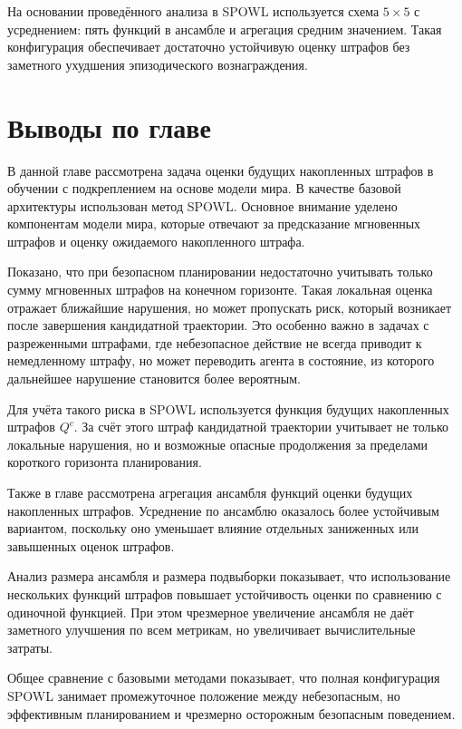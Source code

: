 На основании проведённого анализа в SPOWL используется схема $5 \times 5$ с усреднением: пять функций в ансамбле и агрегация средним значением. Такая конфигурация обеспечивает достаточно устойчивую оценку штрафов без заметного ухудшения эпизодического вознаграждения.
\FloatBarrier

\section{Выводы по главе}
\label{sec:chapter2_conclusion}

В данной главе рассмотрена задача оценки будущих накопленных штрафов в обучении с подкреплением на основе модели мира. В качестве базовой архитектуры использован метод SPOWL. Основное внимание уделено компонентам модели мира, которые отвечают за предсказание мгновенных штрафов и оценку ожидаемого накопленного штрафа.

Показано, что при безопасном планировании недостаточно учитывать только сумму мгновенных штрафов на конечном горизонте. Такая локальная оценка отражает ближайшие нарушения, но может пропускать риск, который возникает после завершения кандидатной траектории. Это особенно важно в задачах с разреженными штрафами, где небезопасное действие не всегда приводит к немедленному штрафу, но может переводить агента в состояние, из которого дальнейшее нарушение становится более вероятным.

Для учёта такого риска в SPOWL используется функция будущих накопленных штрафов $Q^c$. За счёт этого штраф кандидатной траектории учитывает не только локальные нарушения, но и возможные опасные продолжения за пределами короткого горизонта планирования.

Также в главе рассмотрена агрегация ансамбля функций оценки будущих накопленных штрафов. Усреднение по ансамблю оказалось более устойчивым вариантом, поскольку оно уменьшает влияние отдельных заниженных или завышенных оценок штрафов.

Анализ размера ансамбля и размера подвыборки показывает, что использование нескольких функций штрафов повышает устойчивость оценки по сравнению с одиночной функцией. При этом чрезмерное увеличение ансамбля не даёт заметного улучшения по всем метрикам, но увеличивает вычислительные затраты.

Общее сравнение с базовыми методами показывает, что полная конфигурация SPOWL занимает промежуточное положение между небезопасным, но эффективным планированием и чрезмерно осторожным безопасным поведением.
